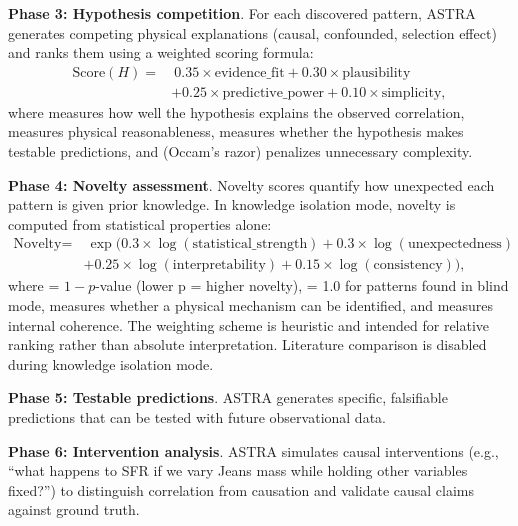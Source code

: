 \documentclass[usenatbib]{rasti}
\begin{document}
\noindent\textbf{Phase 3: Hypothesis competition}. For each discovered pattern, ASTRA generates competing physical explanations (causal, confounded, selection effect) and ranks them using a weighted scoring formula:
\begin{equation}
\begin{split}
\text{Score}(H) = &\ 0.35 \times \text{evidence\_fit} + 0.30 \times \text{plausibility} \\
& + 0.25 \times \text{predictive\_power} + 0.10 \times \text{simplicity},
\end{split}
\end{equation}
where  measures how well the hypothesis explains the observed correlation,  measures physical reasonableness,  measures whether the hypothesis makes testable predictions, and  (Occam's razor) penalizes unnecessary complexity.

\noindent\textbf{Phase 4: Novelty assessment}. Novelty scores quantify how unexpected each pattern is given prior knowledge. In knowledge isolation mode, novelty is computed from statistical properties alone:
\begin{equation}
\begin{split}
\text{Novelty} = &\ \exp(0.3 \times \log(\text{statistical\_strength}) + 0.3 \times \log(\text{unexpectedness}) \\
& + 0.25 \times \log(\text{interpretability}) + 0.15 \times \log(\text{consistency})),
\end{split}
\end{equation}
where  = $1 - p$-value (lower p = higher novelty),  = 1.0 for patterns found in blind mode,  measures whether a physical mechanism can be identified, and  measures internal coherence. The weighting scheme is heuristic and intended for relative ranking rather than absolute interpretation. Literature comparison is disabled during knowledge isolation mode.

\noindent\textbf{Phase 5: Testable predictions}. ASTRA generates specific, falsifiable predictions that can be tested with future observational data.

\noindent\textbf{Phase 6: Intervention analysis}. ASTRA simulates causal interventions (e.g., ``what happens to SFR if we vary Jeans mass while holding other variables fixed?'') to distinguish correlation from causation and validate causal claims against ground truth.
\end{document}
